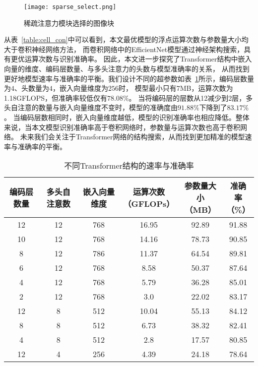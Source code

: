 \begin{figure}[htbp] 
  \centering   
  \texttt{[image: sparse\_select.png]}   
  \caption{稀疏注意力模块选择的图像块}   
  \label{fig:sparse_select} 
\end{figure}  

从表~\ref{table:cell_con}中可以看到，本文最优模型的浮点运算次数与参数量大小均大于卷积神经网络方法，
而卷积网络中的EfficientNet模型通过神经架构搜索，具有更优运算次数与识别准确率。
因此，本文进一步探究了Transformer结构中嵌入向量的维度、编码层数量、与多头注意力的头数与模型准确率的关系，
从而找到更好地模型速率与准确率的平衡。我们设计不同的超参数如表~\ref{table:detect_con}所示，编码层数量为$4$、头数量为$4$，嵌入向量维度为$256$时，
模型最小只有7MB，运算次数为1.18GFLOPS，但准确率较低仅有$78.08\%$。
当将编码层的层数从12减少到2层，多头自注意的数量与嵌入向量维度不变时，模型的准确度由$91.88\%$下降到了$83.17\%$。
当编码层数相同时，嵌入向量维度越低，模型的识别准确率也相应降低。整体来说，当本文模型识别准确率高于卷积网络时，参数量与运算次数也高于卷积网络。
未来我们会关注于Transformer网络的结构搜索，从而找到更加精准的模型速率与准确率的平衡。

\begin{table}[htbp]
  \caption{不同Transformer结构的速率与准确率}   
  \centering 
  \label{table:detect_con}
  \begin{tabular}{cccccc}
    \toprule[2pt]
    编码层数量 & 多头自注意数 & 嵌入向量维度 &  \makecell{运算次数 \\（GFLOPs）} & \makecell{参数量大小\\（MB）} & \makecell{准确率 \\（\%）} \\
    \midrule[1.5pt] 
        12 & 12 & 768 & 16.95 & 92.89 & 91.88 \\
        10 & 12 & 768 & 14.16 & 78.73 & 90.85  \\
        8 & 12 & 786 & 11.37 & 64.54 & 89.81  \\
        6 & 12 & 768 & 8.58 & 50.37 & 87.64 \\
        4 & 12 & 768 & 5.79 & 36.28 & 85.01  \\
        2 & 12 & 768 & 3.0 & 22.02 & 83.17 \\
        12 & 8 & 512 & 10.04 & 55.13 & 84.12 \\ 
        8 & 8 & 512 & 6.73 & 38.32 & 82.41 \\
        4 & 8 & 512 & 2.8 & 17.57 & 80.85  \\
        12 & 4 & 256 & 4.39 & 24.18 & 78.64 \\
    \bottomrule[2pt]      
  \end{tabular} 
\end{table}

